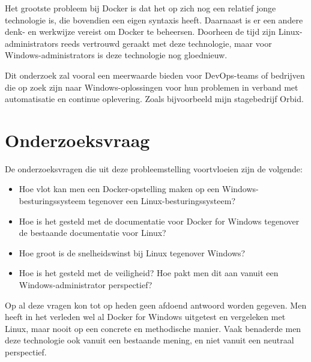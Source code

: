 Het grootste probleem bij Docker is dat het op zich nog een relatief jonge technologie is, die bovendien een eigen syntaxis heeft. Daarnaast is er een andere denk- en werkwijze vereist om Docker te beheersen. Doorheen de tijd zijn Linux-administrators reeds vertrouwd geraakt met deze technologie, maar voor Windows-administrators is deze technologie nog gloednieuw.

Dit onderzoek zal vooral een meerwaarde bieden voor DevOps-teams of bedrijven die op zoek zijn naar Windows-oplossingen voor hun problemen in verband met automatisatie en continue oplevering. Zoals bijvoorbeeld mijn stagebedrijf Orbid. \autocite{Steven2018}

\section{Onderzoeksvraag}
\label{sec:onderzoeksvraag}


De onderzoeksvragen die uit deze probleemstelling voortvloeien zijn de volgende:

\begin{itemize}[noitemsep]
	\item Hoe vlot kan men een Docker-opstelling maken op een Windows-besturingssysteem tegenover een Linux-besturingssysteem?
	\item Hoe is het gesteld met de documentatie voor Docker for Windows tegenover de bestaande documentatie voor Linux?
	\item Hoe groot is de snelheidswinst bij Linux tegenover Windows?
	\item Hoe is het gesteld met de veiligheid? Hoe pakt men dit aan vanuit een Windows-administrator perspectief?
\end{itemize}

Op al deze vragen kon tot op heden geen afdoend antwoord worden gegeven. Men heeft in het verleden wel al Docker for Windows uitgetest en vergeleken met Linux, maar nooit op een concrete en methodische manier. Vaak benaderde men deze technologie ook vanuit een bestaande mening, en niet vanuit een neutraal perspectief.

